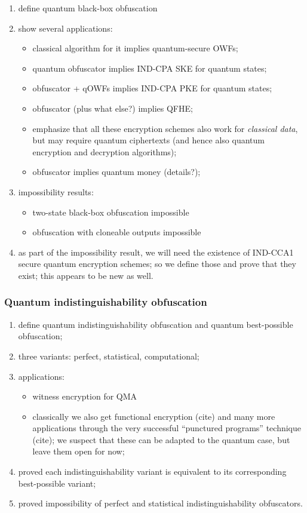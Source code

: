 \documentclass[11pt]{article}
\numberwithin{equation}{section}
\begin{document}
\begin{enumerate}
\item define quantum black-box obfuscation
\item show several applications:
\begin{itemize}
\item classical algorithm for it implies quantum-secure OWFs;
\item quantum obfuscator implies IND-CPA SKE for quantum states;
\item obfuscator + qOWFs implies IND-CPA PKE for quantum states;
\item obfuscator (plus what else?) implies QFHE;
\item emphasize that all these encryption schemes also work for \emph{classical data}, but may require quantum ciphertexts (and hence also quantum encryption and decryption algorithms);
\item obfuscator implies quantum money (details?);
\end{itemize}
\item impossibility results:
\begin{itemize}
\item two-state black-box obfuscation impossible
\item obfuscation with cloneable outputs impossible
\end{itemize}
\item as part of the impossibility result, we will need the existence of IND-CCA1 secure quantum encryption schemes; so we define those and prove that they exist; this appears to be new as well.
\end{enumerate}

\subsubsection{Quantum indistinguishability obfuscation}

\begin{enumerate}
\item define quantum indistinguishability obfuscation and quantum best-possible obfuscation;
\item three variants: perfect, statistical, computational;
\item applications:
\begin{itemize}
\item witness encryption for QMA
\item classically we also get functional encryption (cite) and many more applications through the very successful ``punctured programs'' technique (cite); we suspect that these can be adapted to the quantum case, but leave them open for now;
\end{itemize}
\item proved each indistinguishability variant is equivalent to its corresponding best-possible variant;
\item proved impossibility of perfect and statistical indistinguishability obfuscators.
\end{enumerate}
\end{document}
